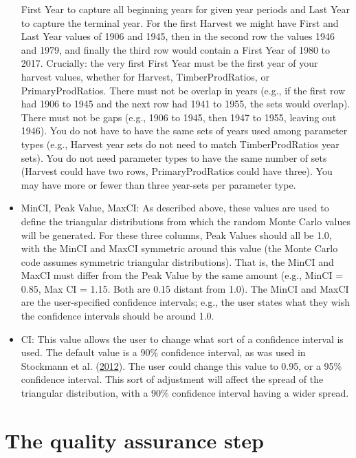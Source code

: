 \documentclass[
  openany]{book}
\begin{document}
\begin{itemize}
  First Year to capture all beginning years for given year periods and
  Last Year to capture the terminal year. For the first Harvest we might
  have First and Last Year values of 1906 and 1945, then in the second
  row the values 1946 and 1979, and finally the third row would contain
  a First Year of 1980 to 2017. Crucially: the very first First Year
  must be the first year of your harvest values, whether for Harvest,
  TimberProdRatios, or PrimaryProdRatios. There must not be overlap in
  years (e.g., if the first row had 1906 to 1945 and the next row had
  1941 to 1955, the sets would overlap). There must not be gaps (e.g.,
  1906 to 1945, then 1947 to 1955, leaving out 1946). You do not have to
  have the same sets of years used among parameter types (e.g., Harvest
  year sets do not need to match TimberProdRatios year sets). You do not
  need parameter types to have the same number of sets (Harvest could
  have two rows, PrimaryProdRatios could have three). You may have more
  or fewer than three year-sets per parameter type.
\item
  MinCI, Peak Value, MaxCI: As described above, these values are used to
  define the triangular distributions from which the random Monte Carlo
  values will be generated. For these three columns, Peak Values should
  all be 1.0, with the MinCI and MaxCI symmetric around this value (the
  Monte Carlo code assumes symmetric triangular distributions). That is,
  the MinCI and MaxCI must differ from the Peak Value by the same amount
  (e.g., MinCI = 0.85, Max CI = 1.15. Both are 0.15 distant from 1.0).
  The MinCI and MaxCI are the user-specified confidence intervals; e.g.,
  the user states what they wish the confidence intervals should be
  around 1.0.
\item
  CI: This value allows the user to change what sort of a confidence
  interval is used. The default value is a 90\% confidence interval, as
  was used in Stockmann et al.
  (\protect\hyperlink{ref-stockmann2012}{2012}). The user could change
  this value to 0.95, or a 95\% confidence interval. This sort of
  adjustment will affect the spread of the triangular distribution, with
  a 90\% confidence interval having a wider spread.
\end{itemize}

\hypertarget{own-qa}{%
\section{The quality assurance step}\label{own-qa}}
\end{document}
